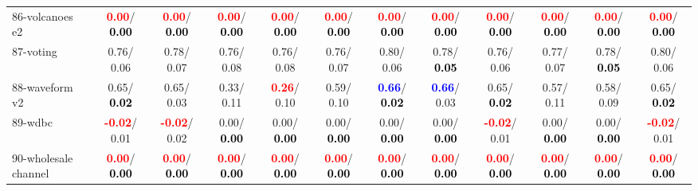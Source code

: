 \begin{table}[h]
\begin{center}
{\begin{tabular}{lc|c|c|c|c|c|c|c|c|c|c}
86-volcanoes e2 & \textcolor{red}{\textbf{  0.00}}/\textcolor{black}{\textbf{  0.00}} & \textcolor{red}{\textbf{  0.00}}/\textcolor{black}{\textbf{  0.00}} & \textcolor{red}{\textbf{  0.00}}/\textcolor{black}{\textbf{  0.00}} & \textcolor{red}{\textbf{  0.00}}/\textcolor{black}{\textbf{  0.00}} & \textcolor{red}{\textbf{  0.00}}/\textcolor{black}{\textbf{  0.00}} & \textcolor{red}{\textbf{  0.00}}/\textcolor{black}{\textbf{  0.00}} & \textcolor{red}{\textbf{  0.00}}/\textcolor{black}{\textbf{  0.00}} & \textcolor{red}{\textbf{  0.00}}/\textcolor{black}{\textbf{  0.00}} & \textcolor{red}{\textbf{  0.00}}/\textcolor{black}{\textbf{  0.00}} & \textcolor{red}{\textbf{  0.00}}/\textcolor{black}{\textbf{  0.00}} & \textcolor{red}{\textbf{  0.00}}/\textcolor{black}{\textbf{  0.00}} \\
87-voting &   0.76/  0.06 &   0.78/  0.07 &   0.76/  0.08 &   0.76/  0.08 &   0.76/  0.07 &   0.80/  0.06 &   0.78/\textcolor{black}{\textbf{  0.05}} &   0.76/  0.06 &   0.77/  0.07 &   0.78/\textcolor{black}{\textbf{  0.05}} &   0.80/  0.06 \\
88-waveform v2 &   0.65/\textcolor{black}{\textbf{  0.02}} &   0.65/  0.03 &   0.33/  0.11 & \textcolor{red}{\textbf{  0.26}}/  0.10 &   0.59/  0.10 & \textcolor{blue}{\textbf{  0.66}}/\textcolor{black}{\textbf{  0.02}} & \textcolor{blue}{\textbf{  0.66}}/  0.03 &   0.65/\textcolor{black}{\textbf{  0.02}} &   0.57/  0.11 &   0.58/  0.09 &   0.65/\textcolor{black}{\textbf{  0.02}} \\
89-wdbc & \textcolor{red}{\textbf{ -0.02}}/  0.01 & \textcolor{red}{\textbf{ -0.02}}/  0.02 &   0.00/\textcolor{black}{\textbf{  0.00}} &   0.00/\textcolor{black}{\textbf{  0.00}} &   0.00/\textcolor{black}{\textbf{  0.00}} &   0.00/\textcolor{black}{\textbf{  0.00}} &   0.00/\textcolor{black}{\textbf{  0.00}} & \textcolor{red}{\textbf{ -0.02}}/  0.01 &   0.00/\textcolor{black}{\textbf{  0.00}} &   0.00/\textcolor{black}{\textbf{  0.00}} & \textcolor{red}{\textbf{ -0.02}}/  0.01 \\
90-wholesale channel & \textcolor{red}{\textbf{  0.00}}/\textcolor{black}{\textbf{  0.00}} & \textcolor{red}{\textbf{  0.00}}/\textcolor{black}{\textbf{  0.00}} & \textcolor{red}{\textbf{  0.00}}/\textcolor{black}{\textbf{  0.00}} & \textcolor{red}{\textbf{  0.00}}/\textcolor{black}{\textbf{  0.00}} & \textcolor{red}{\textbf{  0.00}}/\textcolor{black}{\textbf{  0.00}} & \textcolor{red}{\textbf{  0.00}}/\textcolor{black}{\textbf{  0.00}} & \textcolor{red}{\textbf{  0.00}}/\textcolor{black}{\textbf{  0.00}} & \textcolor{red}{\textbf{  0.00}}/\textcolor{black}{\textbf{  0.00}} & \textcolor{red}{\textbf{  0.00}}/\textcolor{black}{\textbf{  0.00}} & \textcolor{red}{\textbf{  0.00}}/\textcolor{black}{\textbf{  0.00}} & \textcolor{red}{\textbf{  0.00}}/\textcolor{black}{\textbf{  0.00}} \\

\end{tabular}}
\end{center}
\end{table}
